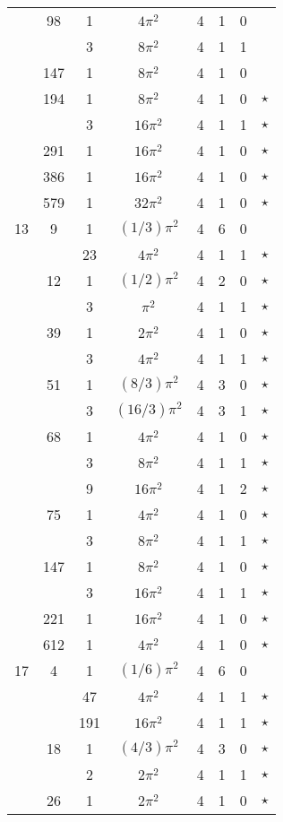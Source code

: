 \documentclass[12pt]{amsart}
\begin{document}
\begin{tabular}{ccc|ccccc}
 & 98 & 1 & $4\pi^2$ & 4 & 1 & 0 &  \\
 &  & 3 & $8\pi^2$ & 4 & 1 & 1 &  \\
 & 147 & 1 & $8\pi^2$ & 4 & 1 & 0 &  \\
 & 194 & 1 & $8\pi^2$ & 4 & 1 & 0 & $\star$ \\
 &  & 3 & $16\pi^2$ & 4 & 1 & 1 & $\star$ \\
 & 291 & 1 & $16\pi^2$ & 4 & 1 & 0 & $\star$ \\
 & 386 & 1 & $16\pi^2$ & 4 & 1 & 0 & $\star$ \\
 & 579 & 1 & $32\pi^2$ & 4 & 1 & 0 & $\star$ \\
13 & 9 & 1 & $(1/3)\pi^2$ & 4 & 6 & 0 &  \\
 &  & 23 & $4\pi^2$ & 4 & 1 & 1 & $\star$ \\
 & 12 & 1 & $(1/2)\pi^2$ & 4 & 2 & 0 & $\star$ \\
 &  & 3 & $\pi^2$ & 4 & 1 & 1 & $\star$ \\
 & 39 & 1 & $2\pi^2$ & 4 & 1 & 0 & $\star$ \\
 &  & 3 & $4\pi^2$ & 4 & 1 & 1 & $\star$ \\
 & 51 & 1 & $(8/3)\pi^2$ & 4 & 3 & 0 & $\star$ \\
 &  & 3 & $(16/3)\pi^2$ & 4 & 3 & 1 & $\star$ \\
 & 68 & 1 & $4\pi^2$ & 4 & 1 & 0 & $\star$ \\
 &  & 3 & $8\pi^2$ & 4 & 1 & 1 & $\star$ \\
 &  & 9 & $16\pi^2$ & 4 & 1 & 2 & $\star$ \\
 & 75 & 1 & $4\pi^2$ & 4 & 1 & 0 & $\star$ \\
 &  & 3 & $8\pi^2$ & 4 & 1 & 1 & $\star$ \\
 & 147 & 1 & $8\pi^2$ & 4 & 1 & 0 & $\star$ \\
 &  & 3 & $16\pi^2$ & 4 & 1 & 1 & $\star$ \\
 & 221 & 1 & $16\pi^2$ & 4 & 1 & 0 & $\star$ \\
 & 612 & 1 & $4\pi^2$ & 4 & 1 & 0 & $\star$ \\
17 & 4 & 1 & $(1/6)\pi^2$ & 4 & 6 & 0 &  \\
 &  & 47 & $4\pi^2$ & 4 & 1 & 1 & $\star$ \\
 &  & 191 & $16\pi^2$ & 4 & 1 & 1 & $\star$ \\
 & 18 & 1 & $(4/3)\pi^2$ & 4 & 3 & 0 & $\star$ \\
 &  & 2 & $2\pi^2$ & 4 & 1 & 1 & $\star$ \\
 & 26 & 1 & $2\pi^2$ & 4 & 1 & 0 & $\star$ \\

\end{tabular}
\end{document}
